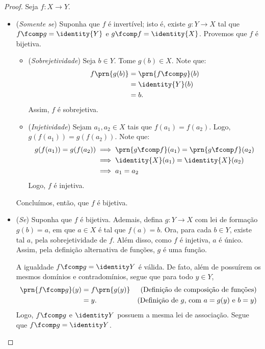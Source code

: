 \begin{proof}
    Seja  $f: X \to Y$.
    \begin{itemize}
        \item (\emph{Somente se}) Suponha que $f$ é invertível; isto é, existe $g : Y \to X$ tal que $f \fcomp g = \identity{Y}$ e $g \fcomp f = \identity{X}$.
        Provemos que $f$ é bijetiva. 
        \begin{itemize}
            \item (\emph{Sobrejetividade}) Seja $b \in Y$.
            Tome $g(b)\in X$.
            Note que:
            \begin{align*}
                f\prn{g(b)} &= \prn{f \fcomp g}(b) \\ &= \identity{Y}(b) \\ &= b.
            \end{align*}
            Assim, $f$ é sobrejetiva.
            \item (\emph{Injetividade}) Sejam $a_1, a_2 \in X$ tais que $f(a_1)=f(a_2)$.
            Logo, $g(f(a_1))=g(f(a_2))$.
            Note que:
            \begin{align*}
                g(f(a_1))=g(f(a_2)) & \implies \prn{g \fcomp f}(a_1) = \prn{g \fcomp f}(a_2) \\
                & \implies \identity{X}(a_1) = \identity{X}(a_2) \\
                & \implies a_1 = a_2
            \end{align*}
            Logo, $f$ é injetiva.
        \end{itemize}
        Concluímos, então, que $f$ é bijetiva.

        \item (\emph{Se}) Suponha que $f$ é bijetiva.
        Ademais, defina $g: Y \to X$ com lei de formação $g(b)=a$, em que $a \in X$ é tal que $f(a)=b$.
        Ora, para cada $b \in Y$, existe tal $a$, pela sobrejetividade de $f$.
        Além disso, como $f$ é injetiva, $a$ é único. 
        Assim, pela definição alternativa de funções, $g$ é uma função.

        A igualdade $f \fcomp g = \identity Y$ é válida. De fato, além de possuírem os mesmos domínios e contradomínios, segue que para todo $y \in Y$,
        \begin{align*}
            \prn{f \fcomp g}(y) & = f\prn{g(y)} & \text{(Definição de composição de funções)} \\ 
             &= y. & \text{(Definição de $g$, com $a=g(y)$ e $b=y$)}
        \end{align*}
        Logo, $f \fcomp g$ e $ \identity Y$ possuem a mesma lei de associação. Segue que  $f \fcomp g = \identity Y$.
        

\end{itemize}
\end{proof}
